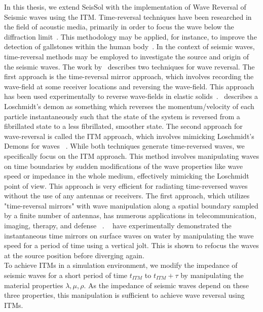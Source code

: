 In this thesis, we extend SeisSol with the implementation of Wave Reversal of Seismic waves using the \acf{ITM}. 
Time-reversal techniques have been researched in the field of acoustic media, primarily in order to focus the wave below
the diffraction limit~\parencite{67072}. This methodology may be applied, for instance, to improve the detection of gallstones within the human body~\parencite{10.1063/1.881692}. 
In the context of seismic waves, time-reversal methods may be employed to investigate the source and origin of the seismic waves.
The work by~\parencite{Fink2017} describes two techniques for wave reversal. The first approach is the time-reversal mirror approach, which involves recording the wave-field at some 
receiver locations and reversing the wave-field. This approach has been used experimentally to reverse wave-fields in elastic solids~\parencite{PhysRevLett.100.064301}.~\parencite{Weinert2016} describes a Loschmidt's demon as something which reverses the momentum/velocity of each particle instantaneously such that the state of the system is reversed 
from a fibrillated state to a less fibrillated, smoother state. The second approach for wave-reversal is called the \acf{ITM} approach, which involves
mimicking Loschmidt's Demons for waves ~\parencite{Fink2017}. 
While both techniques generate time-reversed waves, we specifically focus on the \ac{ITM} approach. 
This method involves manipulating waves on time boundaries by sudden modifications of the wave properties like wave speed or impedance in the whole medium, 
effectively mimicking the Loschmidt point of view. 
This approach is very efficient for radiating time-reversed waves without the use of any antennas or receivers. 
The first approach, which utilizes "time-reversal mirrors" with wave manipulation along a spatial boundary sampled by a finite number of antennas, has numerous applications in telecommunication, imaging, therapy, and defense ~\parencite{Fink2017}. 
~\parencite{Bacot2016} have experimentally demonstrated the instantaneous time mirrors on surface waves on water by manipulating the wave speed for a period of time using a vertical jolt.
This is shown to refocus the waves at the source position before diverging again.\\

To achieve \ac{ITM}s in a simulation environment, we modify the impedance of seismic waves for a short period of time $t_{ITM}$ to $t_{ITM} + \tau$ by manipulating 
the material properties $\lambda, \mu, \rho$. As the impedance of seismic waves depend on these three properties, this manipulation is 
sufficient to achieve wave reversal using \ac{ITM}s.

